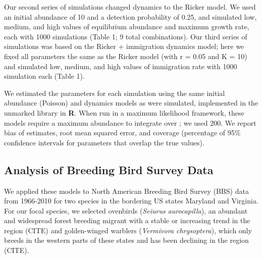 \documentclass[12pt]{article}
\begin{document}
Our second series of simulations changed dynamics to the Ricker model.
We used an initial abundance of 10 and a detection probability of 0.25,
and simulated low, medium, and high values of equilibrium abundance
and maximum growth rate, each with 1000 simulations (Table 1;
9 total combinations).  Our third series of simulations was based on the
Ricker + immigration dynamics model; here we fixed all parameters the
same as the Ricker model (with r = 0.05 and K = 10) and simulated
low, medium, and high values of immigration rate with 1000 simulation
each (Table 1).

We estimated the parameters for each simulation using the same
initial abundance (Poisson) and dynamics models as were
simulated, implemented in the unmarked library in \textbf{R}.  When run
in a maximum likelihood framework, these models require a
maximum abundance to integrate over
\citep{royle:2004biom,dail_madsen:2011};
we used 200.  We report bias of estimates, root
mean squared error, and coverage (percentage of 95\% confidence
intervals for parameters that
overlap the true values).

\subsection{Analysis of Breeding Bird Survey Data}

We applied these models to North American Breeding Bird Survey (BBS)
data from 1966-2010 for two species in the bordering US states
Maryland and Virginia.  For our focal species, we selected ovenbirds
(\textit{Seiurus aurocapilla}), an abundant and widespread forest breeding
migrant with a stable or increasing trend in the region (CITE) and
golden-winged warblers (\textit{Vermivora chrysoptera}), which only breeds in
the western parts of these states and has been declining in the region
(CITE).  %
\end{document}
